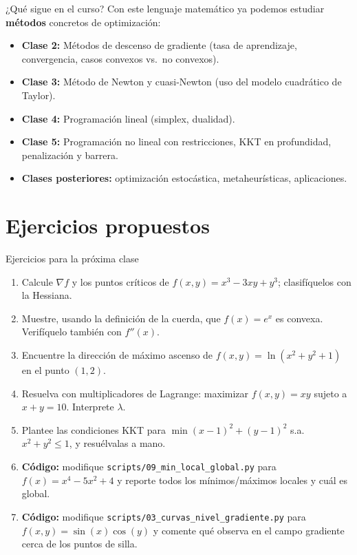 \documentclass[aspectratio=169,10pt]{beamer}
\newcommand{\grad}{\nabla}
\begin{document}
\begin{frame}{¿Qué sigue en el curso?}
  Con este lenguaje matemático ya podemos estudiar \textbf{métodos}
  concretos de optimización:
  \begin{itemize}
    \item \textbf{Clase 2:} Métodos de descenso de gradiente (tasa de
      aprendizaje, convergencia, casos convexos vs.\ no convexos).
    \item \textbf{Clase 3:} Método de Newton y cuasi-Newton (uso del
      modelo cuadrático de Taylor).
    \item \textbf{Clase 4:} Programación lineal (simplex, dualidad).
    \item \textbf{Clase 5:} Programación no lineal con restricciones,
      KKT en profundidad, penalización y barrera.
    \item \textbf{Clases posteriores:} optimización estocástica,
      metaheurísticas, aplicaciones.
  \end{itemize}
\end{frame}

\section{Ejercicios propuestos}

\begin{frame}{Ejercicios para la próxima clase}
  \small
  \begin{enumerate}
    \item Calcule $\grad f$ y los puntos críticos de $f(x,y)=x^3-3xy+y^3$;
      clasifíquelos con la Hessiana.
    \item Muestre, usando la definición de la cuerda, que $f(x)=e^x$ es
      convexa. Verifíquelo también con $f''(x)$.
    \item Encuentre la dirección de máximo ascenso de
      $f(x,y)=\ln(x^2+y^2+1)$ en el punto $(1,2)$.
    \item Resuelva con multiplicadores de Lagrange: maximizar
      $f(x,y)=xy$ sujeto a $x+y=10$. Interprete $\lambda$.
    \item Plantee las condiciones KKT para
      $\min (x-1)^2+(y-1)^2$ s.a.\ $x^2+y^2\le 1$, y resuélvalas a mano.
    \item \textbf{Código:} modifique \texttt{scripts/09\_min\_local\_global.py}
      para $f(x)=x^4-5x^2+4$ y reporte todos los mínimos/máximos locales
      y cuál es global.
    \item \textbf{Código:} modifique \texttt{scripts/03\_curvas\_nivel\_gradiente.py}
      para $f(x,y)=\sin(x)\cos(y)$ y comente qué observa en el campo
      gradiente cerca de los puntos de silla.
  \end{enumerate}
\end{frame}
\end{document}
